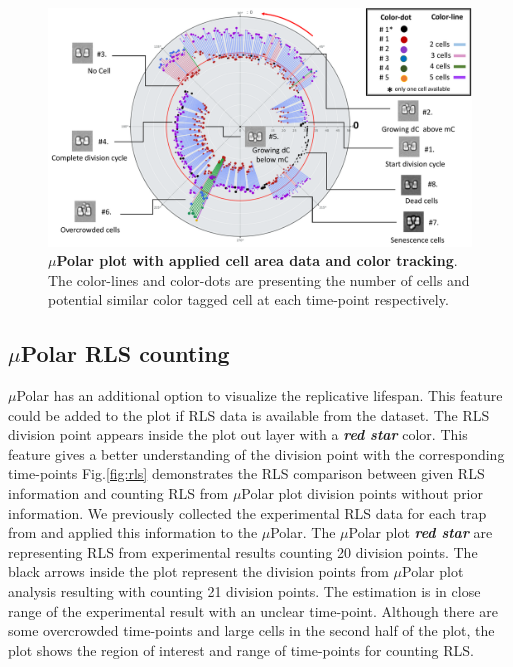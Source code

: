 \documentclass[conference]{IEEEtran}
\begin{document}
 
\begin{figure}
\centering
\includegraphics[width=\textwidth,height=10 cm]{Patterns/explain.pdf}
\caption{ \textbf{ $\mu$Polar plot with applied cell area data and color tracking}. The color-lines and color-dots are presenting the number of cells and potential similar color tagged cell at each time-point respectively.}
\label{fig:explain}
\end{figure}


\subsection{$\mu$Polar RLS counting}
$\mu$Polar has an additional option to visualize the replicative lifespan. This feature could be added to the plot if RLS data is available from the dataset. The RLS division point appears inside the plot out layer with a \textbf{\textit{red star}} color. This feature gives a better understanding of the division point with the corresponding time-points Fig.\ref{fig:rls} demonstrates the RLS comparison between given RLS information and counting RLS from $\mu$Polar plot division points without prior information. We previously collected the experimental RLS data for each trap from \cite{ref02.2} and applied this information to the $\mu$Polar. The $\mu$Polar plot \textbf{\textit{red star}} are representing RLS from experimental results counting 20 division points. The black arrows inside the plot represent the division points from $\mu$Polar plot analysis resulting with counting 21 division points. The estimation is in close range of the  experimental result with an unclear time-point. Although there are some overcrowded time-points and large cells in the second half of the plot, the plot shows the region of interest and range of time-points for counting RLS.       
\end{document}
